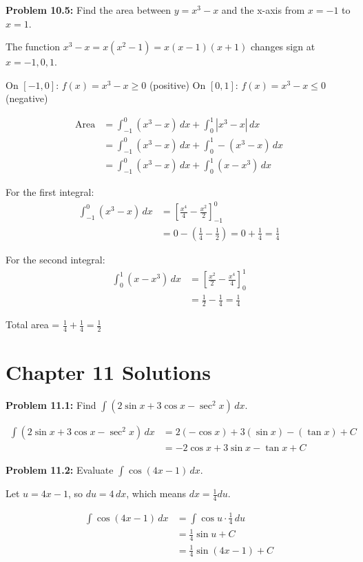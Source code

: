 \documentclass[12pt,a4paper]{book}
\theoremstyle{definition}
\begin{document}
\begin{solution}
\textbf{Problem 10.5:} Find the area between $y = x^3 - x$ and the x-axis from $x = -1$ to $x = 1$.

The function $x^3 - x = x(x^2 - 1) = x(x-1)(x+1)$ changes sign at $x = -1, 0, 1$.

On $[-1, 0]$: $f(x) = x^3 - x \geq 0$ (positive)
On $[0, 1]$: $f(x) = x^3 - x \leq 0$ (negative)

\begin{align}
\text{Area} &= \int_{-1}^0 (x^3 - x) \, dx + \int_0^1 |x^3 - x| \, dx\\
&= \int_{-1}^0 (x^3 - x) \, dx + \int_0^1 -(x^3 - x) \, dx\\
&= \int_{-1}^0 (x^3 - x) \, dx + \int_0^1 (x - x^3) \, dx
\end{align}

For the first integral:
\begin{align}
\int_{-1}^0 (x^3 - x) \, dx &= \left[ \frac{x^4}{4} - \frac{x^2}{2} \right]_{-1}^0\\
&= 0 - \left( \frac{1}{4} - \frac{1}{2} \right) = 0 + \frac{1}{4} = \frac{1}{4}
\end{align}

For the second integral:
\begin{align}
\int_0^1 (x - x^3) \, dx &= \left[ \frac{x^2}{2} - \frac{x^4}{4} \right]_0^1\\
&= \frac{1}{2} - \frac{1}{4} = \frac{1}{4}
\end{align}

Total area = $\frac{1}{4} + \frac{1}{4} = \frac{1}{2}$
\end{solution}

\section*{Chapter 11 Solutions}

\begin{solution}
\textbf{Problem 11.1:} Find $\int (2\sin x + 3\cos x - \sec^2 x) \, dx$.

\begin{align}
\int (2\sin x + 3\cos x - \sec^2 x) \, dx &= 2(-\cos x) + 3(\sin x) - (\tan x) + C\\
&= -2\cos x + 3\sin x - \tan x + C
\end{align}
\end{solution}

\begin{solution}
\textbf{Problem 11.2:} Evaluate $\int \cos(4x - 1) \, dx$.

Let $u = 4x - 1$, so $du = 4 \, dx$, which means $dx = \frac{1}{4} du$.

\begin{align}
\int \cos(4x - 1) \, dx &= \int \cos u \cdot \frac{1}{4} \, du\\
&= \frac{1}{4} \sin u + C\\
&= \frac{1}{4} \sin(4x - 1) + C
\end{align}
\end{solution}
\end{document}
